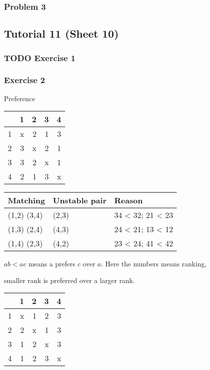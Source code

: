 \documentclass[11pt]{article}
\begin{document}
\subsubsection{Problem 3}
\label{sec:orged95e7f}
\subsection{Tutorial 11 (Sheet 10)}
\label{sec:org58bb4bb}
\subsubsection{{\bfseries\sffamily TODO} Exercise 1}
\label{sec:orge469e04}
\subsubsection{Exercise 2}
\label{sec:org51d9b48}
Preference

\begin{center}
\begin{tabular}{rrrrr}
 & 1 & 2 & 3 & 4\\
\hline
1 & x & 2 & 1 & 3\\
2 & 3 & x & 2 & 1\\
3 & 3 & 2 & x & 1\\
4 & 2 & 1 & 3 & x\\
\end{tabular}
\end{center}

\begin{center}
\begin{tabular}{lll}
Matching & Unstable pair & Reason\\
\hline
(1,2) (3,4) & (2,3) & 34 < 32; 21 < 23\\
(1,3) (2,4) & (4,3) & 24 < 21; 13 < 12\\
(1,4) (2,3) & (4,2) & 23 < 24; 41 < 42\\
\end{tabular}
\end{center}


\(ab < ac\) means a prefers \(c\) over \(a\). Here the numbers means ranking,

smaller rank is preferred over a larger rank.

\begin{center}
\begin{tabular}{rrrrr}
 & 1 & 2 & 3 & 4\\
\hline
1 & x & 1 & 2 & 3\\
2 & 2 & x & 1 & 3\\
3 & 1 & 2 & x & 3\\
4 & 1 & 2 & 3 & x\\
\end{tabular}
\end{center}
\end{document}
